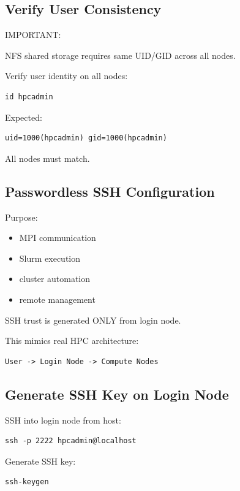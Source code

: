 \documentclass[11pt]{article}
\begin{document}
\subsection{Verify User Consistency}
\label{sec:orgd861a48}

IMPORTANT:

NFS shared storage requires same UID/GID across all nodes.

Verify user identity on all nodes:

\begin{verbatim}
id hpcadmin
\end{verbatim}

Expected:

\begin{verbatim}
uid=1000(hpcadmin) gid=1000(hpcadmin)
\end{verbatim}

All nodes must match.
\subsection{Passwordless SSH Configuration}
\label{sec:org38bc907}

Purpose:

\begin{itemize}
\item MPI communication
\item Slurm execution
\item cluster automation
\item remote management
\end{itemize}

SSH trust is generated ONLY from login node.

This mimics real HPC architecture:

\begin{verbatim}
User -> Login Node -> Compute Nodes
\end{verbatim}
\subsection{Generate SSH Key on Login Node}
\label{sec:orgee0e7d8}

SSH into login node from host:

\begin{verbatim}
ssh -p 2222 hpcadmin@localhost
\end{verbatim}

Generate SSH key:

\begin{verbatim}
ssh-keygen
\end{verbatim}
\end{document}
